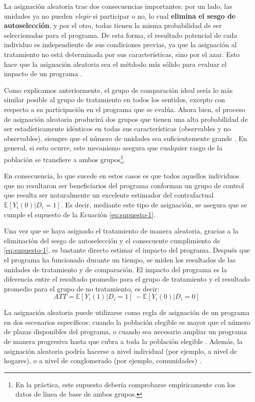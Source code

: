 \documentclass[../../main.tex]{subfiles}
\begin{document}
La asignación aleatoria trae dos consecuencias importantes: por un lado, las unidades ya
no pueden \textit{elegir} si participar o no, lo cual \textbf{elimina el sesgo de
autoselección}, y por el otro, todas tienen la misma probabilidad de ser seleccionadas
para el programa. De esta forma, el resultado potencial de cada individuo es independiente
de sus condiciones previas, ya que la asignación al tratamiento no está determinada por
sus características, sino por el azar. Esto hace que la asignación aleatoria sea el
métdodo más sólido para evaluar el impacto de un programa \cite{gertler-2016}.

Como explicamos anteriormente, el grupo de comparación ideal sería lo más similar posible
al grupo de tratamiento en todos los sentidos, excepto con respecto a su participación en
el programa que se evalúa. Ahora bien, el proceso de asignación aleatoria producirá dos
grupos que tienen una alta probabilidad de ser estadísticamente idénticos en todas sus
características (observables y no observables), siempre que el número de unidades sea
suficientemente grande \cite{gertler-2016}. En general, si esto ocurre, este mecanismo
asegura que cualquier rasgo de la población se transfiere a ambos grupos\footnote{En
la práctica, este supuesto debería comprobarse empíricamente con los datos de línea de
base de ambos grupos.}.

En consecuencia, lo que sucede en estos casos es que todos aquellos individuos que no
resultaron ser beneficiarios del programa conforman un grupo de control que resulta ser
naturalmente un excelente estimador del contrafactual \(\mathbb{E}
\left[Y_i(0)|D_i=1\right]\). Es decir, mediante este tipo de asignación, se asegura que se
cumple el supuesto de la Ecuación \ref{eq:supuesto-1}.

Una vez que se haya asignado el tratamiento de manera aleatoria, gracias a la eliminación
del sesgo de autoselección y el consecuente cumplimiento de \ref{eq:supuesto-1}, es
bastante directo estimar el impacto del programa. Después que el programa ha funcionado
durante un tiempo, se miden los resultados de las unidades de tratamiento y de
comparación. El impacto del programa es la diferencia entre el resultado promedio para el
grupo de tratamiento y el resultado promedio para el grupo de no tratamiento, es decir:
\[
    ATT = \mathbb{E} \left[Y_i(1)|D_i=1\right]\ - \mathbb{E} \left[Y_i(0)|D_i=0\right]\
\]

La asignación aleatoria puede utilizarse como regla de asignación de un programa en dos
escenarios específicos: cuando la población elegible es mayor que el número de plazas
disponibles del programa, o  cuando sea necesario ampliar un programa de manera progresiva
hasta que cubra a toda la población elegible \cite{gertler-2016}. Además, la asignación
aleatoria podría hacerse a nivel individual (por ejemplo, a nivel de hogares), o a nivel
de conglomerado (por ejemplo, comunidades) \cite{bernal}.
\end{document}
